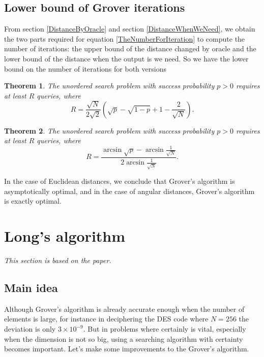 \documentclass[a4paper,10pt]{book}
\newtheorem{theorem}{Theorem}[section]
\numberwithin{equation}{section}
\begin{document}
\subsection{Lower bound of Grover iterations}

From section \ref{DistanceByOracle} and section \ref{DistanceWhenWeNeed}, we obtain the two parts required for equation \ref{TheNumberForIteration} to compute the number of iterations: the upper bound of the distance changed by oracle and the lower bound of the distance when the output is we need. So we have the lower bound on the number of iterations for both versions
\begin{theorem}
    The unordered search problem with success probability $p>0$ requires at least $R$ queries, where
    \begin{equation}
        R =\frac{\sqrt{N}}{2\sqrt{2}}\left(\sqrt{p}-\sqrt{1-p}+1-\frac{2}{\sqrt{N}}\right).
    \end{equation}
\end{theorem}
\begin{theorem}
    The unordered search problem with success probability $p>0$ requires at least $R$ queries, where
    \begin{equation}
        R =\frac{\arcsin\sqrt{p}-\arcsin\frac{1}{\sqrt{N}}}{2\arcsin\frac{1}{\sqrt{N}}}.
    \end{equation}
\end{theorem}
In the case of Euclidean distances, we conclude that Grover's algorithm is asymptotically optimal, and in the case of angular distances, Grover's algorithm is exactly optimal.



\section{Long's algorithm}

\textit{This section is based on the paper\cite{Long_2001}.}

\subsection{\label{subsec:LongMainIdea}Main idea}

Although Grover's algorithm is already accurate enough when the number of elements is large, for instance in deciphering the DES code where $N = 256$ the deviation is only $3\times 10^{-9}$. But in problems where certainly is vital, especially when the dimension is not so big, using a searching algorithm with certainty becomes important. Let's make some improvements to the Grover's algorithm.
\end{document}
